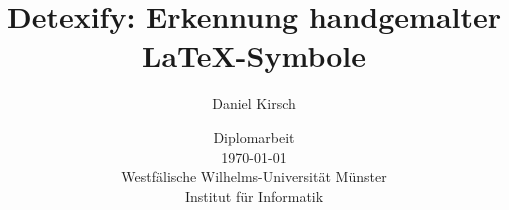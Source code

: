 \documentclass[12pt]{book}
\begin{document}
\frontmatter

\title{Detexify: Erkennung handgemalter \LaTeX-Symbole}

\author{Daniel Kirsch}

\date{\vspace{10mm} Diplomarbeit\\ \vspace{3mm} \today \\
\vspace{20mm}
\vspace{3mm} Westfälische Wilhelms-Universität Münster\\Institut für Informatik}

\maketitle


\rule{0mm}{1mm}
\newpage
\rule{0mm}{1mm}
\newpage


\listoffigures    %
\listoftables     %
\tableofcontents  %


\mainmatter






\appendix




\backmatter



\end{document}
